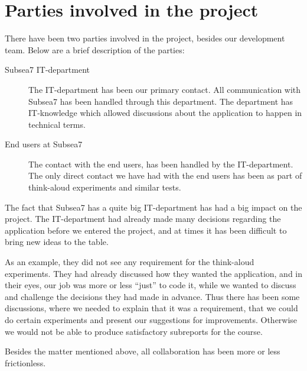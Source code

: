 \section{Parties involved in the project} 
    There have been two parties involved in the project, besides our
    development team. Below are a brief description of the parties:

    \begin{description} \item [Subsea7 IT-department] The IT-department has
                been our primary contact. All communication with Subsea7 has
                been handled through this department. The department has
                IT-knowledge which allowed discussions about the application to
                happen in technical terms.   

        \item [End users at Subsea7] The contact with the end users, has been
    handled by the IT-department. The only direct contact we have had with the
    end users has been as part of think-aloud experiments and similar tests.
    \end{description}

    The fact that Subsea7 has a quite big  IT-department has had a big impact on
    the project. The IT-department had already made many decisions regarding
    the application before we entered the project, and at times it has been
    difficult to bring new ideas to the table. 

    As an example, they did not see any requirement for the think-aloud
    experiments. They had already discussed how they wanted the application,
    and in their eyes, our job was more or less ``just'' to code it, while we
    wanted to discuss and challenge the decisions they had made in advance.
    Thus there has been some discussions, where we needed to explain that it
    was a requirement, that we could do certain experiments and present our
    suggestions for improvements. Otherwise we would not be able to produce
    satisfactory subreports for the course.

    Besides the matter mentioned above, all collaboration has been more or less
    frictionless.
